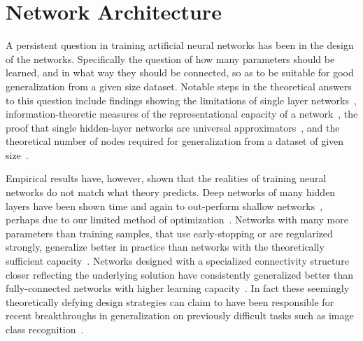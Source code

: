 \documentclass[thesis]{subfiles}
\begin{document}
	\section{Network Architecture}
    A persistent question in training artificial neural networks has been in the design of the networks. Specifically the question of how many parameters should be learned, and in what way they should be connected,  so as to be suitable for good generalization from a given size dataset. Notable steps in the theoretical answers to this question include findings showing the limitations of single layer networks~\citep{minsky1988perceptrons}, information-theoretic measures of the representational capacity of a network~\citep{vapnik2015uniform}, the proof that single hidden-layer networks are universal approximators~\citep{hornik89a}, and the theoretical number of nodes required for generalization from a dataset of given size~\citep{baum1989size}. 
    
    Empirical results have, however, shown that the realities of training neural networks do not match what theory predicts. Deep networks of many hidden layers have been shown time and again to out-perform shallow networks~\citep{Krizhevsky2012,Simonyan2014verydeep,He2015,He2016}, perhaps due to our limited method of optimization~\citep{NIPS2014_5484}. Networks with many more parameters than training samples, that use early-stopping or are regularized strongly, generalize better in practice than networks with the theoretically sufficient capacity~\citep{caruana2001overfitting, Krizhevsky2012, HintonTalk2015}. Networks designed with a specialized connectivity structure closer reflecting the underlying solution have consistently generalized better than fully-connected networks with higher learning capacity~\citep{lecun1989backpropagation,He2016}. In fact these seemingly theoretically defying design strategies can claim to have been responsible for recent breakthroughs in generalization on previously difficult tasks such as image class recognition~\citep{Krizhevsky2012, HintonTalk2015}.
    
\end{document}
